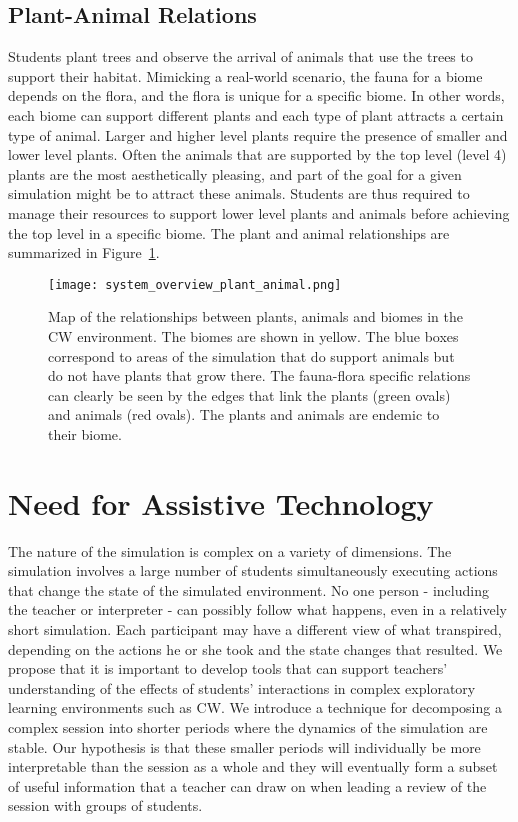 \subsection{Plant-Animal Relations}

Students plant trees and observe the arrival of animals that use the trees to support their habitat. Mimicking a real-world scenario, the fauna for a biome depends on the flora, and the flora is unique for a specific biome. In other words, each biome can support different plants and each type of plant attracts a certain type of animal. Larger and higher level plants require the presence of smaller and lower level plants. Often the animals that are supported by the top level (level 4) plants are the most aesthetically pleasing, and part of the goal for a given simulation might be to attract these animals. Students are thus required to manage their resources to support lower level plants and animals before achieving the top level in a specific biome. The plant and animal relationships are summarized in Figure~\ref{fig:system_overview_plant_animal}.

\begin{figure}
\centering
\texttt{[image: system\_overview\_plant\_animal.png]}
\caption{Map of the relationships between plants, animals and biomes in the CW environment. The biomes are shown in yellow. The blue boxes correspond to areas of the simulation that do support animals but do not have plants that grow there. The fauna-flora specific relations can clearly be seen by the edges that link the plants (green ovals) and animals (red ovals). The plants and animals are endemic to their biome.}
\label{fig:system_overview_plant_animal}
\end{figure}

\section{Need for Assistive Technology}
The nature of the simulation is complex on a variety of dimensions. The simulation involves a large number of students simultaneously executing actions that change the state of the simulated environment.  No one person - including the teacher or interpreter - can possibly follow what happens, even in a relatively short simulation. Each participant may have a different view of what transpired, depending on the actions he or she took and the state changes that resulted. We propose that it is important to develop tools that can support teachers' understanding of the effects of students' interactions in complex exploratory learning environments such as CW. We introduce a technique for decomposing a complex session into shorter periods where the dynamics of the simulation are stable. Our hypothesis is that these smaller periods will individually be more interpretable than the session as a whole and they will eventually form a subset of useful information that a teacher can draw on when leading a review of the session with groups of students.
